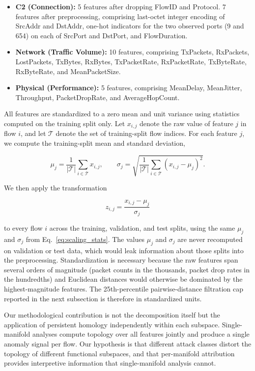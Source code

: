 \documentclass[conf]{new-aiaa}
\begin{document}
\begin{itemize}
    \item \textbf{C2 (Connection):} 5 features after dropping FlowID and Protocol. 7 features after preprocessing, comprising last-octet integer encoding of SrcAddr and DstAddr, one-hot indicators for the two observed ports (9 and 654) on each of SrcPort and DstPort, and FlowDuration.
    \item \textbf{Network (Traffic Volume):} 10 features, comprising TxPackets, RxPackets, LostPackets, TxBytes, RxBytes, TxPacketRate, RxPacketRate, TxByteRate, RxByteRate, and MeanPacketSize.
    \item \textbf{Physical (Performance):} 5 features, comprising MeanDelay, MeanJitter, Throughput, PacketDropRate, and AverageHopCount.
\end{itemize}

All features are standardized to a zero mean and unit variance using statistics computed on the training split only. Let $x_{i,j}$ denote the raw value of feature $j$ in flow $i$, and let $\mathcal{T}$ denote the set of training-split flow indices. For each feature $j$, we compute the training-split mean and standard deviation,

\begin{equation}
\mu_j = \frac{1}{|\mathcal{T}|} \sum_{i \in \mathcal{T}} x_{i,j}, \qquad \sigma_j = \sqrt{\frac{1}{|\mathcal{T}|} \sum_{i \in \mathcal{T}} (x_{i,j} - \mu_j)^2}.
\label{eq:scaling_stats}
\end{equation}

We then apply the transformation

\begin{equation}
z_{i,j} = \frac{x_{i,j} - \mu_j}{\sigma_j}
\label{eq:zscore}
\end{equation}

to every flow $i$ across the training, validation, and test splits, using the same $\mu_j$ and $\sigma_j$ from Eq.~\eqref{eq:scaling_stats}. The values $\mu_j$ and $\sigma_j$ are never recomputed on validation or test data, which would leak information about those splits into the preprocessing. Standardization is necessary because the raw features span several orders of magnitude (packet counts in the thousands, packet drop rates in the hundredths) and Euclidean distances would otherwise be dominated by the highest-magnitude features. The 25th-percentile pairwise-distance filtration cap reported in the next subsection is therefore in standardized units.

Our methodological contribution is not the decomposition itself but the application of persistent homology independently within each subspace. Single-manifold analyses compute topology over all features jointly and produce a single anomaly signal per flow. Our hypothesis is that different attack classes distort the topology of different functional subspaces, and that per-manifold attribution provides interpretive information that single-manifold analysis cannot.
\end{document}
